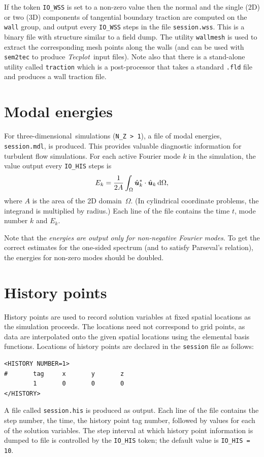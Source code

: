 \documentclass[11pt]{report}
\newcommand{\Tecplot}{\emph{Tecplot}}
\newcommand\threed{three-di\-men\-sion\-al}
\begin{document}
If the token \verb+IO_WSS+ is set to a non-zero value then the normal
and the single (2D) or two (3D) components of tangential boundary
traction are computed on the \verb+wall+ group, and output every
\verb+IO_WSS+ steps in the file \verb+session.wss+.  This is a binary
file with structure similar to a field dump.  The utility
\verb+wallmesh+ is used to extract the corresponding mesh points along
the walls (and can be used with \verb|sem2tec| to produce
\Tecplot\ input files). Note also that there is a stand-alone utility
called \verb+traction+ which is a post-processor that takes a standard
\verb|.fld| file and produces a wall traction file.

\section{Modal energies}
\label{sec.modal}

For \threed\ simulations (\verb+N_Z > 1+), a file of modal energies,
\verb+session.mdl+, is produced.  This provides valuable diagnostic
information for turbulent flow simulations.  For each active Fourier
mode $k$ in the simulation, the value output every \verb+IO_HIS+ steps
is 
\[
E_k =
\frac{1}{2A}\int_\Omega
\hat{\bm{u}}_k^\ast\cdot\hat{\bm{u}}_k \,{\rm d}\Omega,
\]
where $A$ is the area of the 2D domain~$\Omega$.  (In cylindrical
coordinate problems, the integrand is multiplied by radius.) Each line
of the file contains the time $t$, mode number $k$ and $E_k$.

Note that the \emph{energies are output only for non-negative Fourier
modes}.  To get the correct estimates for the one-sided spectrum (and
to satisfy Parseval's relation), the energies for non-zero modes
should be doubled.

\section{History points}
\label{sec.history}

History points are used to record solution variables at fixed spatial
locations as the simulation proceeds.  The locations need not
correspond to grid points, as data are interpolated onto the given
spatial locations using the elemental basis functions.  Locations of
history points are declared in the \verb+session+ file as follows:
%
{\small
\begin{verbatim}
<HISTORY NUMBER=1>
#       tag     x       y       z 
        1       0       0       0
</HISTORY>
\end{verbatim}
}
%
A file called \verb+session.his+ is produced as output.  Each line of
the file contains the step number, the time, the history point tag
number, followed by values for each of the solution variables.  The
step interval at which history point information is dumped to file is
controlled by the \verb+IO_HIS+ token; the default value is
\verb+IO_HIS = 10+.
\end{document}
